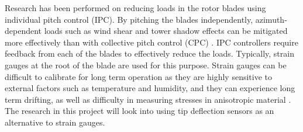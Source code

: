 
Research has been performed on reducing loads in the rotor blades using individual pitch control (IPC). By pitching the blades independently, azimuth-dependent loads such as wind shear and tower shadow effects can be mitigated more effectively than with collective pitch control (CPC) \citep{15_bossanyi}. IPC controllers require feedback from each of the blades to effectively reduce the loads. Typically, strain gauges at the root of the blade are used for this purpose. Strain gauges can be difficult to calibrate for long term operation as they are highly sensitive to external factors such as temperature and humidity, and they can experience long term drifting, as well as difficulty in measuring stresses in anisotropic material \citep{18_Papadopoulos}. The research in this project will look into using tip deflection sensors as an alternative to strain gauges. 

